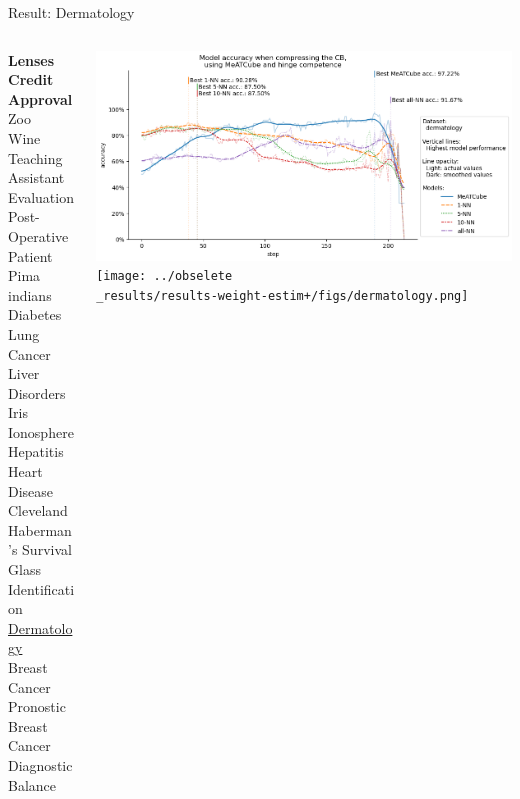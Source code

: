 \documentclass[]{beamer}
\begin{document}
\begin{frame}{Result: Dermatology}
    \begin{columns}
        \begin{column}{.3\textwidth}
            {\smaller\smaller\smaller
            \textbf{Lenses} \\
            \textbf{Credit Approval} \\
            Zoo \\
            Wine \\
            Teaching Assistant Evaluation \\
            Post-Operative Patient \\
            Pima indians Diabetes \\
            Lung Cancer \\
            Liver Disorders \\
            Iris \\
            Ionosphere \\
            Hepatitis \\
            Heart Disease Cleveland \\
            Haberman's Survival \\
            Glass Identification \\
            \underline{Dermatology} \\
            Breast Cancer Pronostic \\
            Breast Cancer Diagnostic \\
            Balance\\
            ~}
        \end{column}
        \begin{column}{.7\textwidth}
            \includegraphics[width=\textwidth]{../results-no-sim-tuning+/figs/dermatology.png}
            \texttt{[image: ../obselete\\\_results/results-weight-estim+/figs/dermatology.png]}
        \end{column}
    \end{columns}
\end{frame}
\end{document}
